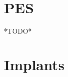 \documentclass[12pt,a4paper,openany]{book}
\begin{document}
	\section{PES}
	*TODO*
	\section{Implants}
\end{document}

